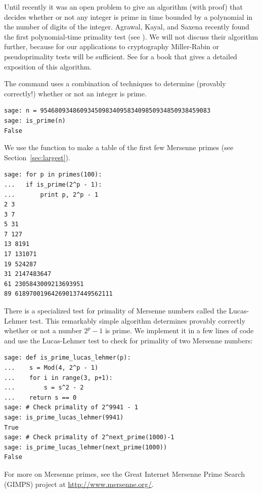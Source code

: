  
Until recently it was an open problem to give an algorithm (with
proof) that decides whether or not any integer is prime in time
bounded by a polynomial in the number of digits of the integer.
Agrawal, Kayal, and Saxena recently found the first polynomial-time
primality test (see \cite{agrawal:primes}).  We will not discuss their
algorithm further, because for our applications to cryptography
Miller-Rabin or pseudoprimality tests will be sufficient.  See
\cite[Ch.~21]{shoup:book} for a book that gives a detailed exposition
of this algorithm.

\begin{sg}
  The  command uses a combination of techniques
  to determine (provably correctly!)  whether or not an integer is
  prime.
\begin{verbatim}
sage: n = 95468093486093450983409583409850934850938459083
sage: is_prime(n)
False
\end{verbatim}
We use the  function to make a table
of the first few Mersenne primes (see Section~\ref{sec:largest}).
\begin{verbatim}
sage: for p in primes(100):
...   if is_prime(2^p - 1):
...       print p, 2^p - 1
2 3
3 7
5 31
7 127
13 8191
17 131071
19 524287
31 2147483647
61 2305843009213693951
89 618970019642690137449562111
\end{verbatim}
\noindent{}There is a specialized test for primality of
Mersenne numbers
called the Lucas-Lehmer test.  This remarkably simple
algorithm determines provably correctly whether or not a number
$2^p - 1$ is prime.
We implement it in a few lines of code
 and use the Lucas-Lehmer test to check for primality
of two Mersenne numbers:
\begin{verbatim}
sage: def is_prime_lucas_lehmer(p):
...    s = Mod(4, 2^p - 1)
...    for i in range(3, p+1):
...        s = s^2 - 2
...    return s == 0
sage: # Check primality of 2^9941 - 1
sage: is_prime_lucas_lehmer(9941)
True
sage: # Check primality of 2^next_prime(1000)-1
sage: is_prime_lucas_lehmer(next_prime(1000))
False
\end{verbatim}
For more on Mersenne primes, see
the Great Internet Mersenne Prime Search (GIMPS)
project at \url{http://www.mersenne.org/}.
\end{sg}

